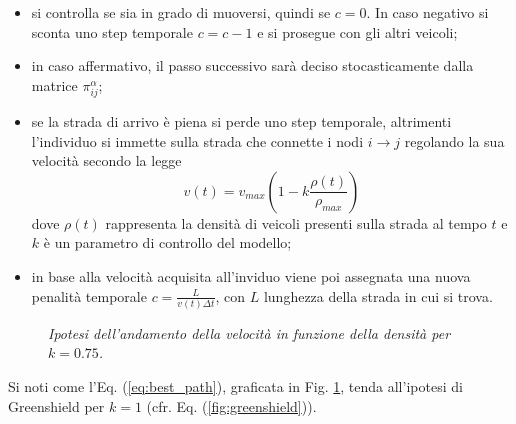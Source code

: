 \documentclass[../main.tex]{subfiles}
\begin{document}
\begin{itemize}
    \item si controlla se sia in grado di muoversi, quindi se $c = 0$. In caso negativo si sconta uno step temporale $c = c -1$ e si prosegue con gli altri veicoli;
    \item in caso affermativo, il passo successivo sarà deciso stocasticamente dalla matrice $\pi_{ij}^{\alpha}$;
    \item se la strada di arrivo \`e piena si perde uno step temporale, altrimenti l'individuo si immette sulla strada che connette i nodi $i \to j$ regolando la sua velocit\`a secondo la legge 
    \begin{equation}
        v(t) = v_{max}\left(1-k\frac{\rho(t)}{\rho_{max}}\right)
        \label{eq:velocity}
    \end{equation}
    dove $\rho(t)$ rappresenta la densit\`a di veicoli presenti sulla strada al tempo $t$ e $k$ \`e un parametro di controllo del modello;
    \item in base alla velocit\`a acquisita all'inviduo viene poi assegnata una nuova penalit\`a temporale $c = \frac{L}{v(t)\Delta t}$, con $L$ lunghezza della strada in cui si trova.
\end{itemize}
\begin{figure}[H]
    \centering
    \caption[Velocit\`a nel modello]{\emph{Ipotesi dell'andamento della velocit\`a in funzione della densit\`a per $k = 0.75$.}}
    \label{fig:velocity}
\end{figure}
Si noti come l'Eq. (\ref{eq:best_path}), graficata in Fig. \ref{fig:velocity}, tenda all'ipotesi di Greenshield per $k = 1$ (cfr. Eq. (\ref{fig:greenshield})).
\end{document}
